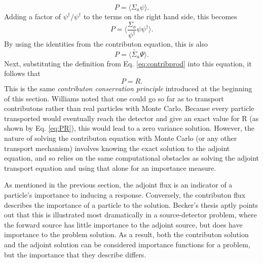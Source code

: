 \begin{equation}
  P  = \langle \Sigma_a \psi \rangle.
\end{equation}
Adding a factor of $\psi^{\dagger}/\psi^{\dagger}$ to the terms on the right hand
side, this becomes
\begin{equation}
  P = \Big \langle \frac{\Sigma_a}{\psi^{\dagger}} \psi \psi^{\dagger} \Big
  \rangle.
\end{equation}
By using the identities from the contributon equation, this is also
\begin{equation}
  P = \langle \widetilde{\Sigma_a} \Psi \rangle .
\end{equation}
Next, substituting the definition from Eq. \eqref{eq:contribprod} into this
equation, it follows that
\begin{equation}
  P = R.
  \label{eq:PR}
\end{equation}
This is the same
\textit{contributon conservation principle} introduced at the beginning of this
section.
Williams noted that one could
go so far as to transport contributons rather than real particles with Monte Carlo.
Because every particle transported would eventually reach the detector and give
an exact value for R (as shown by Eq. \eqref{eq:PR}), this
would lead to a zero variance solution. However, the nature of solving the
contributon equation with Monte Carlo (or any other transport mechanism)
involves knowing the exact solution to the adjoint equation, and so relies on
the same computational obstacles as solving the adjoint transport equation and
using that alone for an importance measure.

As mentioned in the previous section, the adjoint flux is an indicator of a
particle's importance to inducing a response. Conversely, the contributon
flux describes the importance of a particle to the solution.
Becker's thesis \cite{becker_hybrid_2009} aptly points out that this is
illustrated most dramatically in a source-detector problem, where the forward
source has little importance to the adjoint source, but does have importance to
the problem solution. As a result, both the contributon solution and the adjoint
solution can be considered importance functions for a problem, but the
importance that they describe differs.

